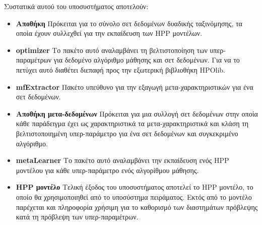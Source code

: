 Συστατικά αυτού του υποσυστήματος αποτελούν:
\begin{itemize}
	\item \textbf{Αποθήκη} Πρόκειται για το σύνολο σετ δεδομένων δυαδικής ταξινόμησης, τα οποία έχουν συλλεχθεί για την εκπαίδευση των HPP μοντέλων.
	\item \textbf{optimizer} Το πακέτο αυτό αναλαμβάνει τη βελτιστοποίηση των υπερ-παραμέτρων για δεδομένο αλγόριθμο μάθησης και σετ δεδομένων. Για να το πετύχει αυτό διαθέτει διεπαφή προς την εξωτερική βιβλιοθήκη HPOlib.
	\item \textbf{mfExtractor} Πακέτο υπεύθυνο για την εξαγωγή μετα-χαρακτηριστικών για ένα σετ δεδομένων.
	\item \textbf{Αποθήκη μετα-δεδομένων} Πρόκειται για μια συλλογή σετ δεδομένων στην οποία κάθε παράδειγμα έχει ως χαρακτηριστικά τα μετα-χαρακτηριστικά και κλάση τη βελτιστοποιημένη υπερ-παράμετρο για ένα σετ δεδομένων και συγκεκριμένο αλγόριθμο.
	\item \textbf{metaLearner} Το πακέτο αυτό αναλαμβάνει την εκπαίδευση ενός HPP μοντέλου για κάθε υπερ-παράμετρο ενός αλγορίθμου μάθησης.
	\item \textbf{HPP μοντέλο} Τελική έξοδος του υποσυστήματος αποτελεί το HPP μοντέλο, το οποίο θα χρησιμοποιηθεί από το υποσύστημα πειράματος. Εκτός από το μοντέλο παρέχεται και πληροφορία χρήσιμη για το καθορισμό των διαστημάτων πρόβλεψης κατά τη πρόβλεψη των υπερ-παραμέτρων.
\end{itemize}


